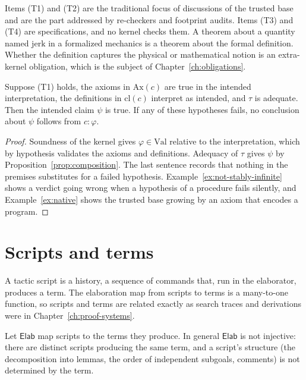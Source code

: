 Items (T1) and (T2) are the traditional focus of discussions of the trusted base and are the part addressed by re-checkers and footprint audits. Items (T3) and (T4) are specifications, and no kernel checks them. A theorem about a quantity named $\mathrm{jerk}$ in a formalized mechanics is a theorem about the formal definition. Whether the definition captures the physical or mathematical notion is an extra-kernel obligation, which is the subject of Chapter~\ref{ch:obligations}.

\begin{proposition}
\label{prop:decomposition}
Suppose (T1) holds, the axioms in $\mathrm{Ax}(c)$ are true in the intended interpretation, the definitions in $\mathrm{cl}(c)$ interpret as intended, and $\tau$ is adequate. Then the intended claim $\psi$ is true. If any of these hypotheses fails, no conclusion about $\psi$ follows from $c:\varphi$.
\end{proposition}

\begin{proof}
Soundness of the kernel gives $\varphi\in\mathrm{Val}$ relative to the interpretation, which by hypothesis validates the axioms and definitions. Adequacy of $\tau$ gives $\psi$ by Proposition~\ref{prop:composition}. The last sentence records that nothing in the premises substitutes for a failed hypothesis. Example~\ref{ex:not-stably-infinite} shows a verdict going wrong when a hypothesis of a procedure fails silently, and Example~\ref{ex:native} shows the trusted base growing by an axiom that encodes a program.
\end{proof}

\section{Scripts and terms}
\label{sec:scripts}

A tactic script is a history, a sequence of commands that, run in the elaborator, produces a term. The elaboration map from scripts to terms is a many-to-one function, so scripts and terms are related exactly as search traces and derivations were in Chapter~\ref{ch:proof-systems}.

\begin{proposition}
\label{prop:scripts}
Let $\mathsf{Elab}$ map scripts to the terms they produce. In general $\mathsf{Elab}$ is not injective: there are distinct scripts producing the same term, and a script's structure (the decomposition into lemmas, the order of independent subgoals, comments) is not determined by the term.
\end{proposition}

